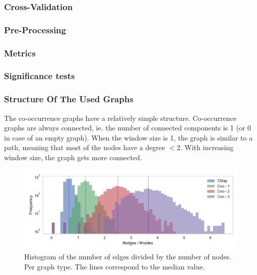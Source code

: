 
\subsubsection{Cross-Validation}

\subsubsection{Pre-Processing}

\subsubsection{Metrics}

\subsubsection{Significance tests}



\subsubsection{Structure Of The Used Graphs}
The co-occurrence graphs have a relatively simple structure.
Co-occurrence graphs are always connected, ie. the number of connected components is 1 (or 0 in case of an empty graph).
When the window size is 1, the graph is similar to a path, meaning that most of the nodes have a degree $< 2$. With increasing window size, the graph gets more connected.

\begin{figure}[h]
\centering
\includegraphics[width=0.7\linewidth]{assets/figures/hist-edgesnodes.pdf}
\caption{Histogram of the number of edges divided by the number of nodes. Per graph type. The lines correspond to the median value.}
\label{fig:histogram-edges-div-nodes-per-type}
\end{figure}

